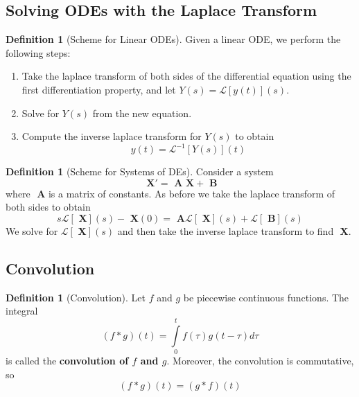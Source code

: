 \documentclass[12pt]{article}
\theoremstyle{definition}
\newtheorem{defn}[thm]{Definition}
\theoremstyle{remark}
\numberwithin{equation}{section}
\newcommand\B[1]{\textbf{ #1}}
\begin{document}
\vspace{1cm}

\subsection{Solving ODEs with the Laplace Transform}

\begin{defn}[Scheme for Linear ODEs]
        Given a linear ODE, we perform the following steps:
        \begin{enumerate}
                \item Take the laplace transform of both sides of the differential equation using the first differentiation property, and let $Y(s) = \mathcal{L}[y(t)](s)$.
                \item Solve for $Y(s)$ from the new equation.
                \item Compute the inverse laplace transform for $Y(s)$ to obtain \begin{equation}
                                y(t) = \mathcal{L}^{-1}[Y(s)](t)
                \end{equation}
        \end{enumerate}
\end{defn}

\vspace{1cm}


\begin{defn}[Scheme for Systems of DEs]
        Consider a system \begin{equation}
                \B{X}' = \B{A}\B{X}+\B{B}
        \end{equation}
        where $\B{A}$ is a matrix of constants. As before we take the laplace transform of both sides to obtain \begin{equation}
                s\mathcal{L}[\B{X}](s)-\B{X}(0) = \B{A}\mathcal{L}[\B{X}](s) + \mathcal{L}[\B{B}](s)
        \end{equation}
        We solve for $\mathcal{L}[\B{X}](s)$ and then take the inverse laplace transform to find $\B{X}$.
\end{defn}


\vspace{1cm}


\subsection{Convolution}

\begin{defn}[Convolution]
        Let $f$ and $g$ be piecewise continuous functions. The integral \begin{equation}
                (f*g)(t) = \int\limits_0^tf(\tau)g(t-\tau)d\tau
        \end{equation}
        is called the \B{convolution of $f$ and $g$}. Moreover, the convolution is commutative, so \begin{equation}
                (f*g)(t) = (g*f)(t)
        \end{equation}
\end{defn}
\end{document}
